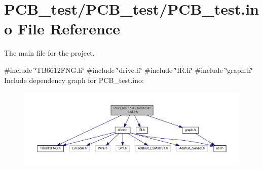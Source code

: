 \hypertarget{PCB__test_8ino}{}\section{P\+C\+B\+\_\+test/\+P\+C\+B\+\_\+test/\+P\+C\+B\+\_\+test.ino File Reference}
\label{PCB__test_8ino}


The main file for the project.  


{\ttfamily \#include \char`\"{}T\+B6612\+F\+N\+G.\+h\char`\"{}}\newline
{\ttfamily \#include \char`\"{}drive.\+h\char`\"{}}\newline
{\ttfamily \#include \char`\"{}I\+R.\+h\char`\"{}}\newline
{\ttfamily \#include \char`\"{}graph.\+h\char`\"{}}\newline
Include dependency graph for P\+C\+B\+\_\+test.\+ino\+:\nopagebreak
\begin{figure}[H]
\begin{center}
\leavevmode
\includegraphics[width=350pt]{PCB__test_8ino__incl}
\end{center}
\end{figure}
